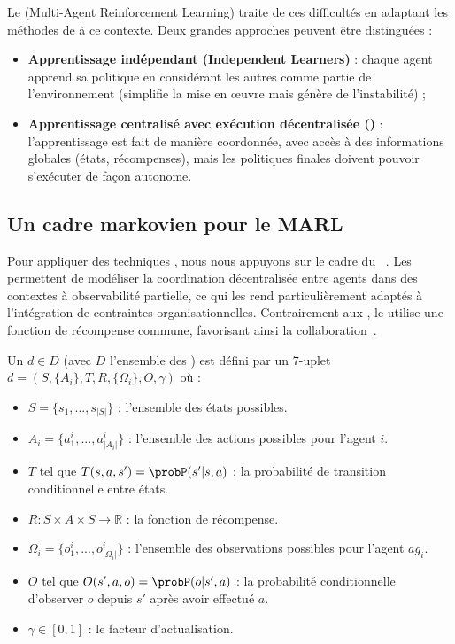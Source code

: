 Le  (Multi-Agent Reinforcement Learning) traite de ces difficultés en adaptant les méthodes de  à ce contexte. Deux grandes approches peuvent être distinguées :
\begin{itemize}
    \item \textbf{Apprentissage indépendant (Independent Learners)} : chaque agent apprend sa politique en considérant les autres comme partie de l'environnement (simplifie la mise en œuvre mais génère de l'instabilité) ;
    \item \textbf{Apprentissage centralisé avec exécution décentralisée ()} : l'apprentissage est fait de manière coordonnée, avec accès à des informations globales (états, récompenses), mais les politiques finales doivent pouvoir s'exécuter de façon autonome.
\end{itemize}

\subsection{Un cadre markovien pour le MARL}

Pour appliquer des techniques , nous nous appuyons sur le cadre du ~\cite{Oliehoek2016}. Les  permettent de modéliser la coordination décentralisée entre agents dans des contextes à observabilité partielle, ce qui les rend particulièrement adaptés à l'intégration de contraintes organisationnelles. Contrairement aux , le  utilise une fonction de récompense commune, favorisant ainsi la collaboration~\cite{Beynier2013}.

Un  $d \in D$ (avec $D$ l'ensemble des ) est défini par un 7-uplet $d = (S,\{A_i\},T,R,\{\Omega_i\},O,\gamma)$ où :
\begin{itemize}
    \item $S = \{s_1, ..., s_{|S|}\}$ : l'ensemble des états possibles.
    \item $A_i = \{a_1^i, ..., a_{|A_i|}^i\}$ : l'ensemble des actions possibles pour l'agent $i$.
    \item $T$ tel que $T(s,a,s') = \probP(s'|s,a)$ : la probabilité de transition conditionnelle entre états.
    \item $R: S \times A \times S \rightarrow \mathbb{R}$ : la fonction de récompense.
    \item $\Omega_i = \{o_1^i, ..., o_{|\Omega_i|}^i\}$ : l'ensemble des observations possibles pour l'agent $ag_i$.
    \item $O$ tel que $O(s',a,o) = \probP(o|s',a)$ : la probabilité conditionnelle d'observer $o$ depuis $s'$ après avoir effectué $a$.
    \item $\gamma \in [0,1]$ : le facteur d'actualisation.
\end{itemize}

